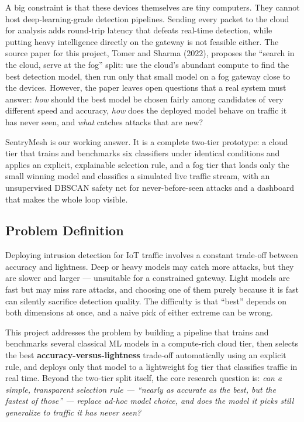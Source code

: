 \documentclass[12pt,a4paper]{article}
\begin{document}
A big constraint is that these devices themselves are tiny computers. They cannot host
deep-learning-grade detection pipelines. Sending every packet to the cloud for
analysis adds round-trip latency that defeats real-time detection, while putting heavy
intelligence directly on the gateway is not feasible either. The source paper for this
project, Tomer and Sharma (2022), proposes the ``search in the cloud, serve at the
fog'' split: use the cloud's abundant compute to find the best detection model, then
run only that small model on a fog gateway close to the devices. However, the paper
leaves open questions that a real system must answer: \emph{how} should the best model
be chosen fairly among candidates of very different speed and accuracy, \emph{how}
does the deployed model behave on traffic it has never seen, and \emph{what} catches
attacks that are new?

SentryMesh is our working answer. It is a complete two-tier prototype: a cloud tier
that trains and benchmarks six classifiers under identical conditions and applies an
explicit, explainable selection rule, and a fog tier that loads only the small winning
model and classifies a simulated live traffic stream, with an unsupervised DBSCAN
safety net for never-before-seen attacks and a dashboard that makes the whole loop
visible.

\subsection{Problem Definition}
Deploying intrusion detection for IoT traffic involves a constant trade-off between
accuracy and lightness. Deep or heavy models may catch more attacks, but they are
slower and larger --- unsuitable for a constrained gateway. Light models are fast but
may miss rare attacks, and choosing one of them purely because it is fast can silently
sacrifice detection quality. The difficulty is that ``best'' depends on both
dimensions at once, and a naive pick of either extreme can be wrong.

This project addresses the problem by building a pipeline that trains and benchmarks
several classical ML models in a compute-rich cloud tier, then selects the best
\textbf{accuracy-versus-lightness} trade-off automatically using an explicit rule, and
deploys only that model to a lightweight fog tier that classifies traffic in real
time. Beyond the two-tier split itself, the core research question is: \emph{can a
simple, transparent selection rule --- ``nearly as accurate as the best, but the
fastest of those'' --- replace ad-hoc model choice, and does the model it picks still
generalize to traffic it has never seen?}
\end{document}
